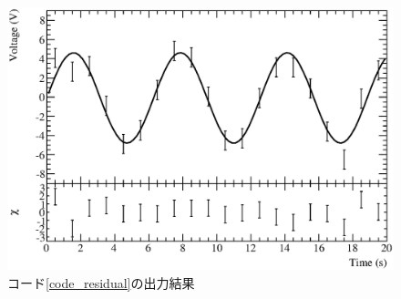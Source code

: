 \begin{figure}
  \begin{center}
    \includegraphics[width=12cm,clip]{fig/residual.eps}
    \caption{コード\ref{code_residual}の出力結果}
    \label{fig_residual_eps}
  \end{center}
\end{figure}

\begin{NoFloat}

\end{NoFloat}
